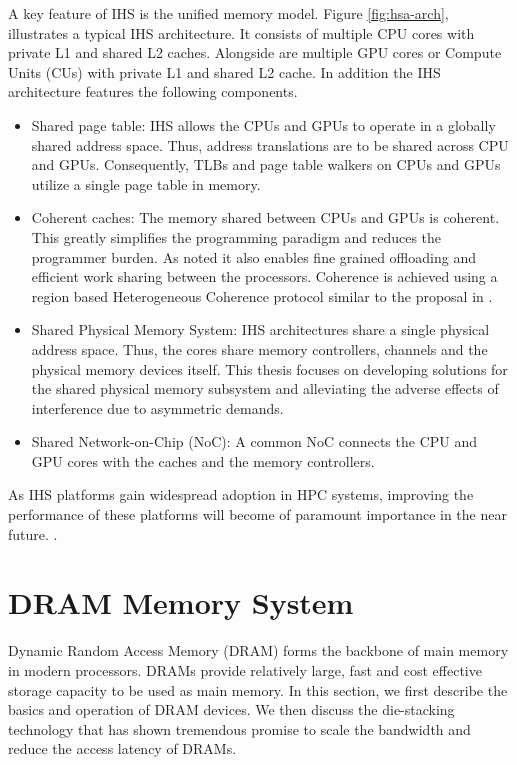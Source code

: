 \par A key feature of IHS is the unified memory model.  Figure \ref{fig:hsa-arch}, illustrates a typical IHS architecture. It consists of multiple CPU cores with private L1 and shared L2 caches. Alongside are multiple GPU cores or Compute Units (CUs) with private L1 and shared L2 cache. In addition the IHS architecture features the following components.
\begin{itemize}
	\item Shared page table: IHS allows the CPUs and GPUs to operate in a globally shared address space. Thus, address translations are to be shared across CPU and GPUs. Consequently, TLBs and page table walkers on CPUs and GPUs utilize a single page table in memory.
	\item Coherent caches: The memory shared between CPUs and GPUs is coherent. This greatly simplifies the programming paradigm and reduces the programmer burden. As noted it also enables fine grained offloading and efficient work sharing between the processors. Coherence is achieved using a region based Heterogeneous Coherence protocol similar to the proposal in \cite{hsc-coherence}.
	\item Shared Physical Memory System: IHS architectures share a single physical address space. Thus, the cores share memory controllers, channels and the physical memory devices itself. This thesis focuses on developing solutions for the shared physical memory subsystem and alleviating the adverse effects of interference due to asymmetric demands. 
	\item Shared Network-on-Chip (NoC): A common NoC connects the CPU and GPU cores with the caches and the memory controllers.
\end{itemize}
As IHS platforms gain widespread adoption in HPC systems, improving the performance of these platforms will become of paramount importance in the near future. \cite{apu-exascale,amd-exascale1}. 

\section{DRAM Memory System}
Dynamic Random Access Memory (DRAM) forms the backbone of main memory in modern processors. DRAMs provide relatively large, fast and cost effective storage capacity to be used as main memory. In this section, we first describe the basics and operation of DRAM  devices. We then discuss the die-stacking technology that has shown tremendous promise to scale the bandwidth and reduce the access latency of DRAMs.
